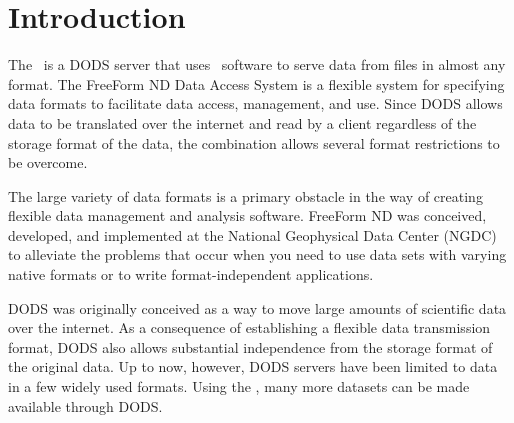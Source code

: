 %
%


\chapter{Introduction}
\label{ff,dintro}

The \ffs\ is a DODS server that uses \ffnd\ software to serve data
from files in almost any format.  The FreeForm ND Data Access System
is a flexible system for specifying data formats to facilitate data
access, management, and use.  Since DODS allows data to be translated
over the internet and read by a client regardless of the storage
format of the data, the combination allows several format restrictions
to be overcome.

The large variety of data formats is a primary obstacle in the way of
creating flexible data management and analysis software. FreeForm ND
was conceived, developed, and implemented at the National Geophysical
Data Center (NGDC) to alleviate the problems that occur when you need
to use data sets with varying native formats or to write
format-independent applications.

DODS was originally conceived as a way to move large amounts of
scientific data over the internet.  As a consequence of establishing a
flexible data transmission format, DODS also allows substantial
independence from the storage format of the original data.  Up to now,
however, DODS servers have been limited to data in a few widely used
formats.  Using the \ffs , many more datasets can be made available
through DODS.





